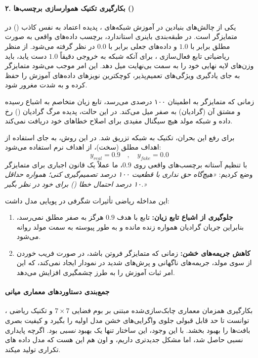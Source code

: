 \documentclass{article}
\begin{document}
\paragraph{۲. بکارگیری تکنیک هموارسازی برچسب‌ها ()}
یکی از چالش‌های بنیادین در آموزش شبکه‌های ، پدیده اعتماد به نفس کاذب () در متمایزگر است. در طبقه‌بندی باینری استاندارد، برچسب داده‌های واقعی به صورت مطلق برابر با $1.0$ و داده‌های جعلی برابر با $0.0$ در نظر گرفته می‌شود. از منظر ریاضیاتی تابع فعال‌سازی ، برای آنکه شبکه به خروجی دقیقاً $1.0$ دست یابد، باید وزن‌های لایه نهایی خود را به سمت بی‌نهایت میل دهد. این امر موجب می‌شود متمایزگر به جای یادگیری ویژگی‌های تعمیم‌پذیر، کوچکترین نویزهای داده‌های آموزش را حفظ کرده و به شدت مغرور شود.

زمانی که متمایزگر به اطمینان ۱۰۰ درصدی می‌رسد، تابع زیان متخاصم به اشباع رسیده و مشتق آن (گرادیان) به صفر میل می‌کند. در این حالت، پدیده مرگ گرادیان () رخ داده و شبکه مولد هیچ سیگنال مفیدی برای اصلاح خطاهای خود دریافت نمی‌کند.

برای رفع این بحران، تکنیک  به شبکه تزریق شد. در این روش، به جای استفاده از اهداف مطلق (سخت)، از اهداف نرم استفاده می‌شود:
$$y_{real} = 0.9 \quad , \quad y_{fake} = 0.0$$
با تنظیم آستانه برچسب‌های واقعی روی $0.9$، ما عملاً یک قانون اجباری برای متمایزگر وضع کردیم: \textit{«هیچ‌گاه حق نداری با قطعیت ۱۰۰ درصد تصمیم‌گیری کنی؛ همواره حداقل ۱۰ درصد احتمال خطا () برای خود در نظر بگیر.»}

این مداخله ریاضی تأثیرات شگرفی در پویایی مدل داشت:
\begin{enumerate}
	\item \textbf{جلوگیری از اشباع تابع زیان:} تابع  با هدف $0.9$ هرگز به صفر مطلق نمی‌رسد، بنابراین جریان گرادیان همواره زنده مانده و به طور پیوسته به سمت مولد روانه می‌شود.
	\item \textbf{کاهش جریمه‌های خشن:} زمانی که متمایزگر فروتن باشد، در صورت فریب خوردن از سوی مولد، جریمه‌های ناگهانی و پرش‌های شدید در نمودار  ایجاد نمی‌کند، که این امر ثبات آموزش را به طرز چشمگیری افزایش می‌دهد.
\end{enumerate}

\paragraph{جمع‌بندی دستاوردهای معماری میانی}
بکارگیری همزمان معماری چابک‌سازی‌شده مبتنی بر بوم فضایی $7 \times 7$ و تکنیک ریاضی ، توانست تا حد قابل قبولی جلوی واگرایی‌های خشن مدل اولیه را بگیرد و کیفیت بصری بافت‌ها را بهبود بخشد. با این وجود، این ساختار تنها یک بهبود \textit{نسبی} بود. اگرچه پایداری نسبی حاصل شد، اما مشکل جدیدتری داریم، و اون هم این هست که مدل داده های تکراری تولید میکند. 
\end{document}
